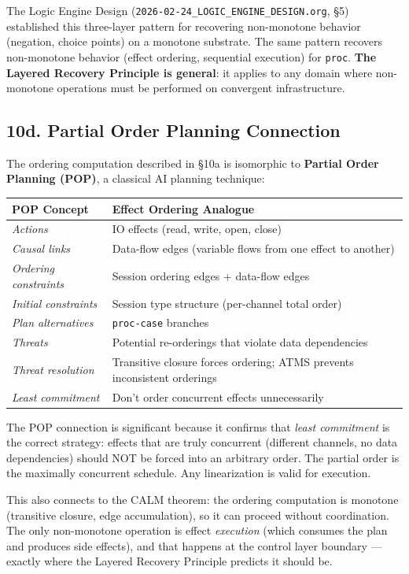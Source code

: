 \documentclass[11pt]{article}
\begin{document}
The Logic Engine Design (\texttt{2026-02-24\_LOGIC\_ENGINE\_DESIGN.org}, §5) established
this three-layer pattern for recovering non-monotone behavior (negation, choice
points) on a monotone substrate. The same pattern recovers non-monotone behavior
(effect ordering, sequential execution) for \texttt{proc}. \textbf{\textbf{The Layered Recovery
Principle is general}}: it applies to any domain where non-monotone operations
must be performed on convergent infrastructure.
\subsection{10d. Partial Order Planning Connection}
\label{sec:org5aa8817}

The ordering computation described in §10a is isomorphic to \textbf{\textbf{Partial Order
Planning (POP)}}, a classical AI planning technique:

\begin{center}
\begin{tabular}{ll}
POP Concept & Effect Ordering Analogue\\
\hline
\emph{Actions} & IO effects (read, write, open, close)\\
\emph{Causal links} & Data-flow edges (variable flows from one effect to another)\\
\emph{Ordering constraints} & Session ordering edges + data-flow edges\\
\emph{Initial constraints} & Session type structure (per-channel total order)\\
\emph{Plan alternatives} & \texttt{proc-case} branches\\
\emph{Threats} & Potential re-orderings that violate data dependencies\\
\emph{Threat resolution} & Transitive closure forces ordering; ATMS prevents inconsistent orderings\\
\emph{Least commitment} & Don't order concurrent effects unnecessarily\\
\end{tabular}
\end{center}

The POP connection is significant because it confirms that \emph{least commitment}
is the correct strategy: effects that are truly concurrent (different channels,
no data dependencies) should NOT be forced into an arbitrary order. The partial
order is the maximally concurrent schedule. Any linearization is valid for
execution.

This also connects to the CALM theorem: the ordering computation is monotone
(transitive closure, edge accumulation), so it can proceed without coordination.
The only non-monotone operation is effect \emph{execution} (which consumes the plan
and produces side effects), and that happens at the control layer boundary —
exactly where the Layered Recovery Principle predicts it should be.
\end{document}
